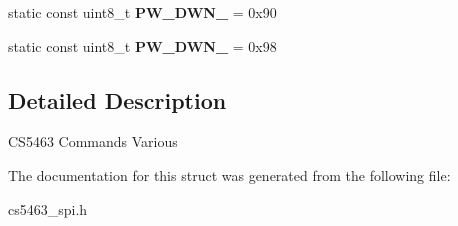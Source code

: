\begin{DoxyCompactItemize}
\item 
\hypertarget{structcs5463Commands_a571254cc9d466702ed3341ce846180dd}{static const uint8\-\_\-t {\bfseries P\-W\-\_\-\-D\-W\-N\-\_} = 0x90}\label{structcs5463Commands_a571254cc9d466702ed3341ce846180dd}

\item 
\hypertarget{structcs5463Commands_acf576c3cc079de9b270933247276c8bf}{static const uint8\-\_\-t {\bfseries P\-W\-\_\-\-D\-W\-N\-\_} = 0x98}\label{structcs5463Commands_acf576c3cc079de9b270933247276c8bf}

\end{DoxyCompactItemize}


\subsection{Detailed Description}
C\-S5463 Commands Various 

The documentation for this struct was generated from the following file\-:\begin{DoxyCompactItemize}
\item 
cs5463\-\_\-spi.\-h\end{DoxyCompactItemize}
